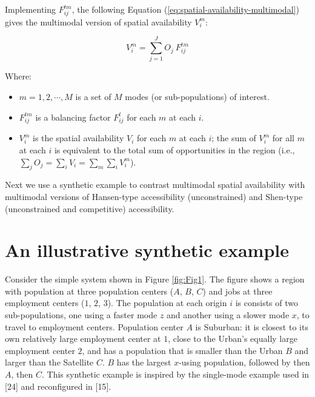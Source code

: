 \documentclass[10pt,letterpaper]{article}
\providecommand{\tightlist}{%
  \setlength{\itemsep}{0pt}\setlength{\parskip}{0pt}}
\begin{document}
Implementing \(F^{tm}_{ij}\), the following Equation
(\ref{eq:spatial-availability-multimodal}) gives the multimodal version
of spatial availability \(V_i^m\):

\begin{equation}
\label{eq:spatial-availability-multimodal}
V^m_{i} = \sum_{j=1}^J O_j\ F^{tm}_{ij}
\end{equation}

\noindent Where:

\begin{itemize}
\tightlist
\item
  \(m = 1, 2,\cdots, M\) is a set of \(M\) modes (or sub-populations) of
  interest.
\item
  \(F^{tm}_{ij}\) is a balancing factor \(F^t_{ij}\) for each \(m\) at
  each \(i\).
\item
  \(V^m_{i}\) is the spatial availability \(V_{i}\) for each \(m\) at
  each \(i\); the sum of \(V^m_{i}\) for all \(m\) at each \(i\) is
  equivalent to the total sum of opportunities in the region (i.e.,
  \(\sum_j O_j = \sum_i V_i = \sum_{m} \sum_{i} V^m_{i}\)).
\end{itemize}

Next we use a synthetic example to contrast multimodal spatial
availability with multimodal versions of Hansen-type accessibility
(unconstrained) and Shen-type (unconstrained and competitive)
accessibility.

\hypertarget{an-illustrative-synthetic-example}{%
\section{An illustrative synthetic
example}\label{an-illustrative-synthetic-example}}

Consider the simple system shown in Figure \ref{fig:Fig1}. The figure
shows a region with population at three population centers (\(A\),
\(B\), \(C\)) and jobs at three employment centers (\(1\), \(2\),
\(3\)). The population at each origin \(i\) is consists of two
sub-populations, one using a faster mode \(z\) and another using a
slower mode \(x\), to travel to employment centers. Population center
\(A\) is Suburban: it is closest to its own relatively large employment
center at \(1\), close to the Urban's equally large employment center
\(2\), and has a population that is smaller than the Urban \(B\) and
larger than the Satellite \(C\). \(B\) has the largest \(x\)-using
population, followed by then \(A\), then \(C\). This synthetic example
is inspired by the single-mode example used in {[}24{]} and reconfigured
in {[}15{]}.
\end{document}
